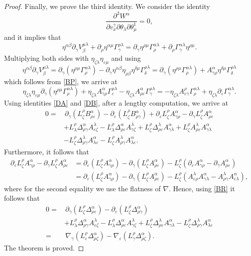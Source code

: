 \documentclass[11pt,a4paper]{amsart}
\numberwithin{equation}{section}
\newcommand{\qa}{\alpha}
\newcommand{\qb}{\beta}
\newcommand{\qd}{\delta}
\newcommand{\qg}{\gamma}
\newcommand{\qth}{\theta}
\newcommand{\qe}{\varepsilon}
\newcommand{\qz}{\zeta}
\newcommand{\qp}{\partial}
\newcommand{\Qg}{\Gamma}
\newcommand{\ql}{\lambda}
\newcommand{\Qd}{\Delta}
\newcommand{\kk}[1]{\left(#1\right)}
\numberwithin{equation}{section}
\begin{document}
\begin{proof}
Finally, we prove the third identity. We consider the identity 
\[
\frac{\qp^3 W^\qa}{\qp v^\qg_x\qp\qth_\ql\qp\qth_\mu^1} = 0,
\]
and it implies that 
\[
\eta^{\qa\qb}\qp_\qg V^{\mu\ql}_\qb+\qp_\rho\eta^{\qa\mu}\Qg^{\rho\ql}_\qg = \qp_\qg\eta^{\rho\mu}\Qg^{\qa\ql}_\rho+\qp_\rho\Qg^{\qa\ql}_\qg \eta^{\rho\mu}.
\]
Multiplying both sides with $\eta_{\qz\ql}\eta_{\qe\mu}$ and using 
\[
\eta^{\qa\qb}\qp_\qg V^{\mu\ql}_\qb = \qp_\qg\kk{\eta^{\rho\mu}\Qg^{\qa\ql}_\rho}-\qp_\qg\eta^{\qa\qb}\eta_{\rho\qb}\eta^{\qd\mu}\Qg^{\rho\ql}_\qd = \qp_\qg\kk{\eta^{\rho\mu}\Qg^{\qa\ql}_\rho}+A^\qa_{\qg\rho}\eta^{\qd\mu}\Qg^{\rho\ql}_\qd
\]
which follows from \eqref{BP}, we arrive at 
\begin{equation*}
\eta_{\qz\ql}\eta_{\qe\mu}\qp_\qg\kk{\eta^{\rho\mu}\Qg^{\qa\ql}_\rho}+\eta_{\qz\ql}A^\qa_{\qg\rho}\Qg^{\rho\ql}_\qe-\eta_{\qz\ql}A^\qa_{\rho\qe}\Qg^{\rho\ql}_\qg = -\eta_{\qz\ql}A^\rho_{\qe\qg}\Qg^{\qa\ql}_\rho+\eta_{\qz\ql}\qp_\qe\Qg^{\qa\ql}_\qg.
\end{equation*}
Using identities \eqref{DA} and \eqref{DB}, after a lengthy computation, we arrive at 
\begin{align*}
  0=&\, \qp_\qg\kk{L^\rho_\qz B^\qa_{\rho\qe}}-\qp_\qe\kk{L^\rho_\qz B^\qa_{\rho\qg}}+\qp_\qe L^\rho_\qz A^\qa_{\qg\rho}-\qp_\qg L^\rho_\qz A^\qa_{\rho\qe}\\
  &+L^\rho_\ql\Qd^\qa_{\rho\qg}A^\ql_{\qe\qz}-L^\rho_\ql \Qd^\qa_{\rho\qe}A^\ql_{\qg\qz}+L^\rho_\qz\Qd^\ql_{\rho\qe}A^\qa_{\qg\ql}+L^\rho_\qz A^\ql_{\rho\qe}A^\qa_{\qg\ql}\\
  &-L^\rho_\qz\Qd^\ql_{\rho\qg}A^\qa_{\ql\qe}-L^\rho_\qz A^\ql_{\rho\qg}A^\qa_{\ql\qe}.
\end{align*}
Furthermore, it follows that
\begin{align*}
  \qp_\qe L^\rho_\qz A^\qa_{\qg\rho}-\qp_\qg L^\rho_\qz A^\qa_{\rho\qe} &=\qp_\qe\kk{ L^\rho_\qz A^\qa_{\qg\rho}}-\qp_\qg \kk{L^\rho_\qz A^\qa_{\rho\qe}}- L^\rho_\qz\kk{\qp_\qe A^\qa_{\qg\rho}-\qp_\qg A^\qa_{\rho\qe}}\\
  &=\qp_\qe\kk{ L^\rho_\qz A^\qa_{\qg\rho}}-\qp_\qg \kk{L^\rho_\qz A^\qa_{\rho\qe}}- L^\rho_\qz\kk{A^\ql_{\qe\rho}A^\qa_{\qg\ql}-A^\ql_{\rho\qg}A^\qa_{\qe\ql}},
\end{align*}
where for the second equality we use the flatness of $\nabla$. Hence, using \eqref{BR} it follows that
\begin{align*}
  0=&\, \qp_\qg\kk{L^\rho_\qz \Qd^\qa_{\rho\qe}}-\qp_\qe\kk{L^\rho_\qz \Qd^\qa_{\rho\qg}}\\
  &+L^\rho_\ql\Qd^\qa_{\rho\qg}A^\ql_{\qe\qz}-L^\rho_\ql \Qd^\qa_{\rho\qe}A^\ql_{\qg\qz}+L^\rho_\qz\Qd^\ql_{\rho\qe}A^\qa_{\qg\ql}-L^\rho_\qz\Qd^\ql_{\rho\qg}A^\qa_{\ql\qe}\\
  =&\,\nabla_\qg\kk{L^\rho_\qe \Qd^\qa_{\rho\qz}}-\nabla_\qe\kk{L^\rho_\qg \Qd^\qa_{\rho\qz}}.
\end{align*} 
The theorem is proved.
\end{proof}
\end{document}
